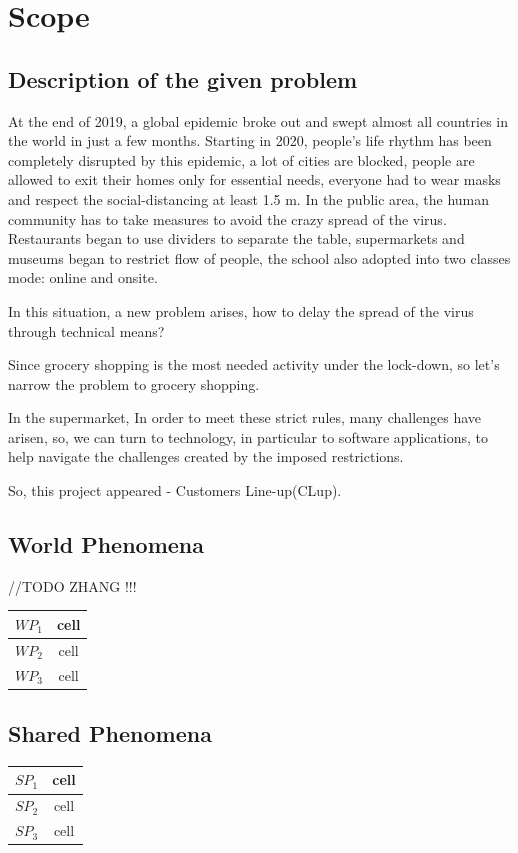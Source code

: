 \documentclass[a4paper,12pt]{report}
\begin{document}
\section{Scope}
\subsection{Description of the given problem}

At the end of 2019, a global epidemic broke out and swept almost all countries in the world in just a few months. Starting in 2020, people's life rhythm has been completely disrupted by this epidemic, a lot of cities are blocked, people are allowed to exit their homes only for essential needs, everyone had to wear masks and respect the social-distancing at least 1.5 m. In the public area, the human community has to take measures to avoid the crazy spread of the virus. Restaurants began to use dividers to separate the table, supermarkets and museums began to restrict flow of people, the school also adopted into two classes mode: online and onsite.

In this situation, a new problem arises, how to delay the spread of the virus through technical means? 

Since grocery shopping is the most needed activity under the lock-down, so let’s narrow the problem to grocery shopping.

In the supermarket, In order to meet these strict rules, many challenges have arisen, so, we can turn to technology, in particular to software applications, to help navigate the challenges created by the imposed restrictions.

So, this project appeared - Customers Line-up(CLup).

\subsection{World Phenomena}

//TODO ZHANG !!!
\begin{center}
	\begin{tabular}{ c|c } 
		\hline
		$WP_1$ & cell \\ 
		\hline
		$WP_2$ & cell \\ 
		\hline
		$WP_3$ & cell \\ 
		\hline
	\end{tabular}
\end{center}

\subsection{Shared Phenomena}
\begin{center}
	\begin{tabular}{ c|c } 
		\hline
		$SP_1$ & cell \\ 
		\hline
		$SP_2$ & cell \\ 
		\hline
		$SP_3$ & cell \\ 
		\hline
	\end{tabular}
\end{center}
\end{document}
